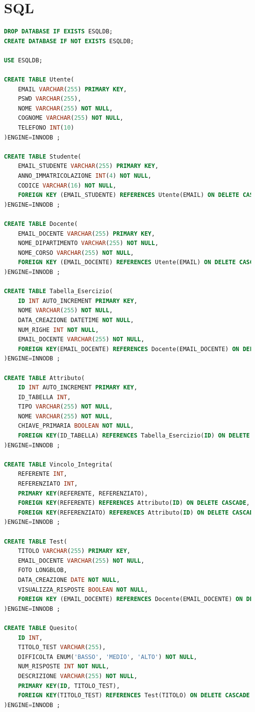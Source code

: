 \documentclass{article}
\begin{document}
\newpage
\section{SQL}
\begin{lstlisting}[language=SQL, title=Codice SQL completo dello schema della base di dati.]
DROP DATABASE IF EXISTS ESQLDB;
CREATE DATABASE IF NOT EXISTS ESQLDB;

USE ESQLDB;

CREATE TABLE Utente(
    EMAIL VARCHAR(255) PRIMARY KEY,
    PSWD VARCHAR(255),
    NOME VARCHAR(255) NOT NULL,
    COGNOME VARCHAR(255) NOT NULL,
    TELEFONO INT(10)
)ENGINE=INNODB ;

CREATE TABLE Studente(
    EMAIL_STUDENTE VARCHAR(255) PRIMARY KEY,
    ANNO_IMMATRICOLAZIONE INT(4) NOT NULL,
    CODICE VARCHAR(16) NOT NULL,
    FOREIGN KEY (EMAIL_STUDENTE) REFERENCES Utente(EMAIL) ON DELETE CASCADE
)ENGINE=INNODB ;

CREATE TABLE Docente(
    EMAIL_DOCENTE VARCHAR(255) PRIMARY KEY,
    NOME_DIPARTIMENTO VARCHAR(255) NOT NULL,
    NOME_CORSO VARCHAR(255) NOT NULL,
    FOREIGN KEY (EMAIL_DOCENTE) REFERENCES Utente(EMAIL) ON DELETE CASCADE
)ENGINE=INNODB ;

CREATE TABLE Tabella_Esercizio(
    ID INT AUTO_INCREMENT PRIMARY KEY,
    NOME VARCHAR(255) NOT NULL,
    DATA_CREAZIONE DATETIME NOT NULL,
    NUM_RIGHE INT NOT NULL,
    EMAIL_DOCENTE VARCHAR(255) NOT NULL,
    FOREIGN KEY(EMAIL_DOCENTE) REFERENCES Docente(EMAIL_DOCENTE) ON DELETE CASCADE
)ENGINE=INNODB ;

CREATE TABLE Attributo(
    ID INT AUTO_INCREMENT PRIMARY KEY,
    ID_TABELLA INT,
    TIPO VARCHAR(255) NOT NULL,
    NOME VARCHAR(255) NOT NULL,
    CHIAVE_PRIMARIA BOOLEAN NOT NULL,
    FOREIGN KEY(ID_TABELLA) REFERENCES Tabella_Esercizio(ID) ON DELETE CASCADE 
)ENGINE=INNODB ;

CREATE TABLE Vincolo_Integrita(
    REFERENTE INT,
    REFERENZIATO INT,
    PRIMARY KEY(REFERENTE, REFERENZIATO),
    FOREIGN KEY(REFERENTE) REFERENCES Attributo(ID) ON DELETE CASCADE,
    FOREIGN KEY(REFERENZIATO) REFERENCES Attributo(ID) ON DELETE CASCADE
)ENGINE=INNODB ;

CREATE TABLE Test(
    TITOLO VARCHAR(255) PRIMARY KEY,
    EMAIL_DOCENTE VARCHAR(255) NOT NULL,
    FOTO LONGBLOB,
    DATA_CREAZIONE DATE NOT NULL,
    VISUALIZZA_RISPOSTE BOOLEAN NOT NULL,
    FOREIGN KEY (EMAIL_DOCENTE) REFERENCES Docente(EMAIL_DOCENTE) ON DELETE CASCADE
)ENGINE=INNODB ;

CREATE TABLE Quesito(
    ID INT,
    TITOLO_TEST VARCHAR(255),
    DIFFICOLTA ENUM('BASSO', 'MEDIO', 'ALTO') NOT NULL,
    NUM_RISPOSTE INT NOT NULL,
    DESCRIZIONE VARCHAR(255) NOT NULL,
    PRIMARY KEY(ID, TITOLO_TEST),
    FOREIGN KEY(TITOLO_TEST) REFERENCES Test(TITOLO) ON DELETE CASCADE
)ENGINE=INNODB ;


\end{lstlisting}
\end{document}
